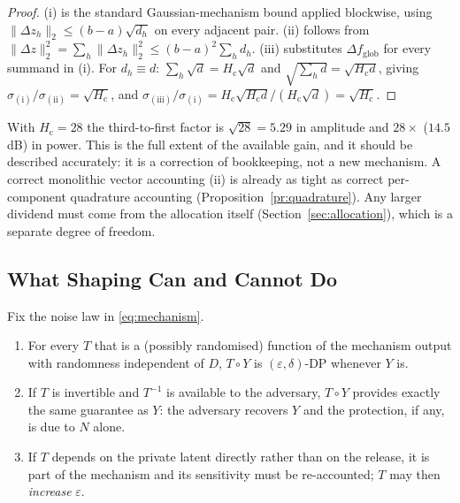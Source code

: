 \begin{proof}
(i) is the standard Gaussian-mechanism bound applied blockwise, using
$\|\Delta z_h\|_2\le(b-a)\sqrt{d_h}$ on every adjacent pair.
(ii) follows from $\|\Delta z\|_2^2=\sum_h\|\Delta z_h\|_2^2
\le(b-a)^2\sum_h d_h$. (iii) substitutes $\Delta f_{\mathrm{glob}}$ for every
summand in (i). For $d_h\equiv d$:
$\sum_h\sqrt d=H_{\mathrm c}\sqrt d$ and
$\sqrt{\sum_h d}=\sqrt{H_{\mathrm c}d}$, giving
$\sigma_{\mathrm{(i)}}/\sigma_{\mathrm{(ii)}}=\sqrt{H_{\mathrm c}}$, and
$\sigma_{\mathrm{(iii)}}/\sigma_{\mathrm{(i)}}=
H_{\mathrm c}\sqrt{H_{\mathrm c}d}/(H_{\mathrm c}\sqrt d)=\sqrt{H_{\mathrm c}}$.
\end{proof}

With $H_{\mathrm c}=28$ the third-to-first factor is $\sqrt{28}=5.29$ in
amplitude and $28\times$ ($14.5$\,dB) in power. This is the full extent of
the available gain, and it should be described accurately: it is a correction
of bookkeeping, not a new mechanism. A correct monolithic vector accounting
(ii) is already as tight as correct per-component quadrature accounting
(Proposition~\ref{pr:quadrature}). Any larger dividend must come from the
allocation itself (Section~\ref{sec:allocation}), which is a separate degree
of freedom.

\subsection{What Shaping Can and Cannot Do}
\label{sec:shaping}

\begin{theorem}
\label{th:postproc}
Fix the noise law in \eqref{eq:mechanism}.
\begin{enumerate}
\item[(i)] For every $T$ that is a (possibly randomised) function of the
mechanism output with randomness independent of $D$, $T\circ Y$ is
$(\varepsilon,\delta)$-DP whenever $Y$ is.
\item[(ii)] If $T$ is invertible and $T^{-1}$ is available to the adversary,
$T\circ Y$ provides exactly the same guarantee as $Y$: the adversary recovers
$Y$ and the protection, if any, is due to $N$ alone.
\item[(iii)] If $T$ depends on the private latent directly rather than on the
release, it is part of the mechanism and its sensitivity must be re-accounted;
$T$ may then \emph{increase} $\varepsilon$.
\end{enumerate}
\end{theorem}

